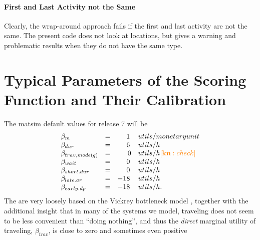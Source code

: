 \paragraph*{First and Last Activity not the Same}

Clearly, the wrap-around approach fails if the first and last activity are not the same.  The present code does not look at locations, but gives a warning and problematic results when they do not have the same type.

\section{Typical Parameters of the Scoring Function and Their Calibration}
\label{sec:typicalParams}



The \gls{matsim} default values for release 7 will be
\begin{equation}
  \begin{array}{lcrl}
\beta_{m} & = & 1\, & utils/monetary unit \\
\beta_{dur} & = & 6\, & utils/h \\
\beta_{trav, mode(q)} & = & 0 & utils/h {\color{orange} [\textbf{kn}: check]} \\
\beta_{wait} & = & 0\, & utils/h \\
\beta_{short.dur} & = & 0\, & utils/h \\
\beta_{late.ar} & = & -18\, & utils/h \\
\beta_{early.dp} & = & -18\, & utils/h .\\
  \end{array}
\label{eq:std-params}
\end{equation}
The are very loosely based on the Vickrey bottleneck model \citep[e.g.][]{ArnottEtcBottleneck-inelastic}, together with the additional insight that in many of the systems we model, traveling does not seem to be less convenient than ``doing nothing'', and thus the \emph{direct} marginal utility of traveling, $\beta_{trav}$, is close to zero and sometimes even positive \citep[\cf][]{} 

